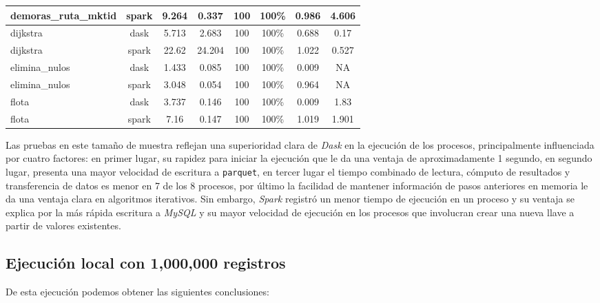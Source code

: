 \begin{table}[]
{\begin{tabular}{|l|c|c|c|c|c|c|c|}
demoras\_ruta\_mktid & spark & {\color{gray}9.264} & 0.337 & 100 & 100\% & 0.986 & 4.606 \\
\hline
dijkstra & dask & {\color{orange}5.713} & 2.683 & 100 & 100\% & 0.688 & 0.17 \\
dijkstra & spark & 22.62 & 24.204 & 100 & 100\% & 1.022 & 0.527 \\
\hline
elimina\_nulos & dask & {\color{orange}1.433} & 0.085 & 100 & 100\% & 0.009 & NA \\
elimina\_nulos & spark & 3.048 & 0.054 & 100 & 100\% & 0.964 & NA \\
\hline
flota & dask & {\color{orange}3.737} & 0.146 & 100 & 100\% & 0.009 & 1.83 \\
flota & spark & 7.16 & 0.147 & 100 & 100\% & 1.019 & 1.901 \\
\hline
\end{tabular}}
\end{table}

Las pruebas en este tamaño de muestra reflejan una superioridad clara de \textit{Dask} en la ejecución de los procesos, principalmente influenciada por cuatro factores: en primer lugar, su rapidez para iniciar la ejecución que le da una ventaja de aproximadamente 1 segundo, en segundo lugar, presenta una mayor velocidad de escritura a \texttt{parquet}, en tercer lugar el tiempo combinado de lectura, cómputo de resultados y transferencia de datos es menor en 7 de los 8 procesos, por último la facilidad de mantener información de pasos anteriores en memoria le da una ventaja clara en algoritmos iterativos. Sin embargo, \textit{Spark} registró un menor tiempo de ejecución en un proceso y su ventaja se explica por la más rápida escritura a \textit{MySQL} y su mayor velocidad de ejecución en los procesos que involucran crear una nueva llave a partir de valores existentes. 

\subsection{Ejecución local con 1,000,000 registros}

De esta ejecución podemos obtener las siguientes conclusiones:

